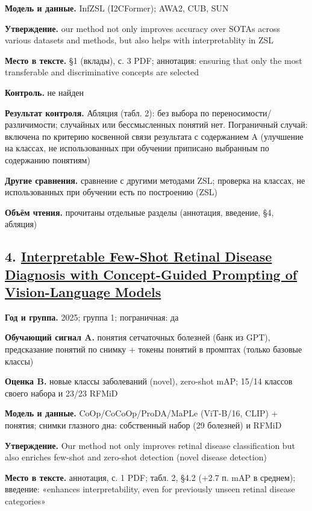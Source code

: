 \textbf{Модель и данные.} InfZSL (I2CFormer); AWA2, CUB, SUN

\textbf{Утверждение.} our method not only improves accuracy over SOTAs across various datasets and methods, but also helps with interpretablity in ZSL

\textbf{Место в тексте.} §1 (вклады), с. 3 PDF; аннотация: ensuring that only the most transferable and discriminative concepts are selected

\textbf{Контроль.} не найден

\textbf{Результат контроля.} Абляция (табл. 2): без выбора по переносимости/различимости; случайных или бессмысленных понятий нет. Пограничный случай: включена по критерию косвенной связи результата с содержанием A (улучшение на классах, не использованных при обучении приписано выбранным по содержанию понятиям)

\textbf{Другие сравнения.} сравнение с другими методами ZSL; проверка на классах, не использованных при обучении есть по построению (ZSL)

\textbf{Объём чтения.} прочитаны отдельные разделы (аннотация, введение, §4, абляция)


\subsection*{4. \href{https://doi.org/10.1007/978-3-031-96625-5_18}{Interpretable Few-Shot Retinal Disease Diagnosis with Concept-Guided Prompting of Vision-Language Models}}

\textbf{Год и группа.} 2025; группа 1; пограничная: да

\textbf{Обучающий сигнал A.} понятия сетчаточных болезней (банк из GPT), предсказание понятий по снимку + токены понятий в промптах (только базовые классы)

\textbf{Оценка B.} новые классы заболеваний (novel), zero-shot mAP; 15/14 классов своего набора и 23/23 RFMiD

\textbf{Модель и данные.} CoOp/CoCoOp/ProDA/MaPLe (ViT-B/16, CLIP) + понятия; снимки глазного дна: собственный набор (29 болезней) и RFMiD

\textbf{Утверждение.} Our method not only improves retinal disease classification but also enriches few-shot and zero-shot detection (novel disease detection)

\textbf{Место в тексте.} аннотация, с. 1 PDF; табл. 2, §4.2 (+2.7 п. mAP в среднем); введение: «enhances interpretability, even for previously unseen retinal disease categories»


